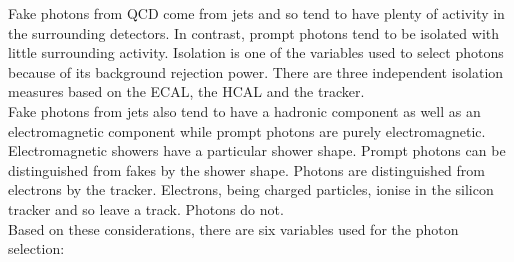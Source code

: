 Fake photons from QCD come from jets and so tend to have plenty of activity in
the surrounding detectors. In contrast, prompt photons tend to be isolated with
little surrounding activity. Isolation is one of the variables used to select 
photons because of its background rejection power. There are three independent 
isolation measures based on the ECAL, the HCAL and the tracker. \\

Fake photons from jets also tend to have a hadronic component as well as an
electromagnetic component while prompt photons are purely electromagnetic.
Electromagnetic showers have a particular shower shape. Prompt photons can be 
distinguished from fakes by the shower shape. Photons are distinguished from 
electrons by the tracker. Electrons, being charged particles, ionise in the 
silicon tracker and so leave a track. Photons do not. \\ 

Based on these considerations, there are six variables used for the photon 
selection:

